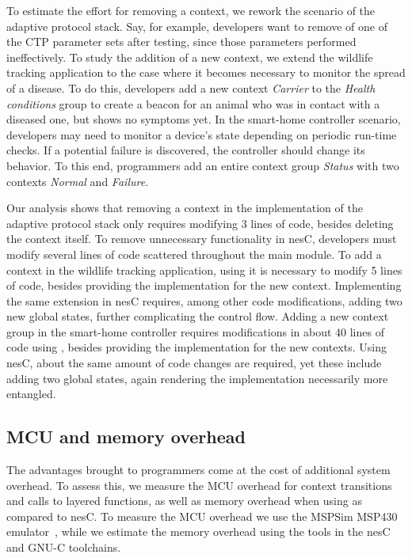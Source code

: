 To estimate the effort for removing a context, we rework the scenario
of the adaptive protocol stack. Say, for example, developers want to
remove of one of the CTP parameter sets after testing, since those
parameters performed ineffectively. To study the addition of a new
context, we extend the wildlife tracking application to the case where
it becomes necessary to monitor the spread of a disease. To do this,
developers add a new context \emph{Carrier} to the \emph{Health
  conditions} group to create a beacon for an animal who was in
contact with a diseased one, but shows no symptoms yet. In the
smart-home controller scenario, developers may need to monitor a
device's state depending on periodic run-time checks. If a potential
failure is discovered, the controller should change its behavior. To
this end, programmers add an entire context group \emph{Status} with
two contexts \emph{Normal} and \emph{Failure}.

 Our analysis shows that removing a context in the
\conesc implementation of the adaptive protocol stack only requires
modifying 3 lines of code, besides deleting the context itself. To
remove unnecessary functionality in nesC, developers must modify
several lines of code scattered throughout the main module. To add a
context in the wildlife tracking application, using \conesc it is
necessary to modify 5 lines of code, besides providing the
implementation for the new context. Implementing the same extension in
nesC requires, among other code modifications, adding two new global
states, further complicating the control flow. Adding a new context
group in the smart-home controller requires modifications in about 40
lines of code using \conesc, besides providing the implementation for
the new contexts. Using nesC, about the same amount of code changes
are required, yet these include adding two global states, again
rendering the implementation necessarily more entangled.


\subsection{MCU and memory overhead}\label{sec:overhead}

The advantages brought to programmers come at the cost of additional
system overhead. To assess this, we measure the MCU overhead for
context transitions and calls to layered functions, as well as memory
overhead when using \conesc as compared to nesC. To measure the MCU
overhead we use the MSPSim MSP430 emulator~\cite{eriksson09}, while we
estimate the memory overhead using the tools in the nesC and GNU-C
toolchains.

